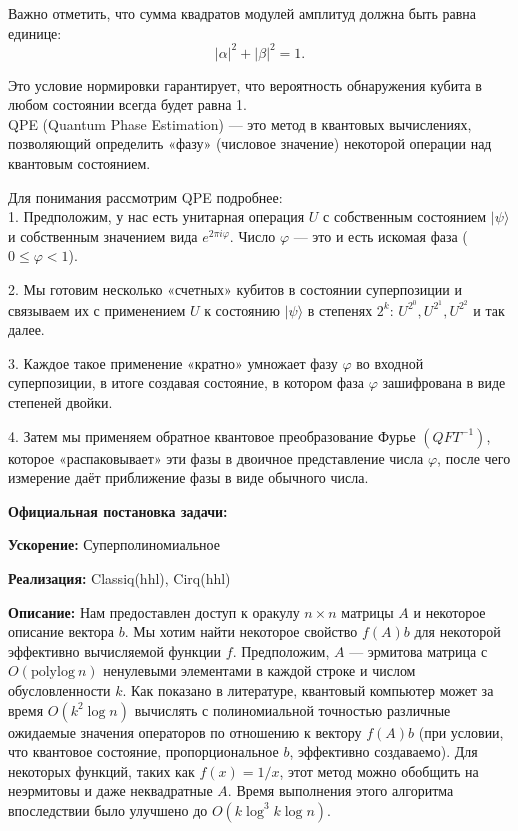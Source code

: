 Важно отметить, что сумма квадратов модулей амплитуд должна быть равна единице:
\[
|\alpha|^2 + |\beta|^2 = 1.
\]

Это условие нормировки гарантирует, что вероятность обнаружения кубита в любом состоянии всегда будет равна 1.\\

QPE (Quantum Phase Estimation) — это метод в квантовых вычислениях, позволяющий определить «фазу» (числовое значение) некоторой операции над квантовым состоянием.

Для понимания рассмотрим QPE подробнее: \\

1. Предположим, у нас есть унитарная операция \(U\) с собственным состоянием \(|\psi\rangle\) и собственным значением вида \(e^{2\pi i \varphi}\). Число \(\varphi\) — это и есть искомая фаза (\(0 \leq \varphi < 1\)).

2. Мы готовим несколько «счетных» кубитов в состоянии суперпозиции и связываем их с применением \(U\) к состоянию \(|\psi\rangle\) в степенях \(2^k\): \(U^{2^0}, U^{2^1}, U^{2^2}\) и так далее.

3. Каждое такое применение «кратно» умножает фазу \(\varphi\) во входной суперпозиции, в итоге создавая состояние, в котором фаза \(\varphi\) зашифрована в виде степеней двойки.

4. Затем мы применяем обратное квантовое преобразование Фурье \((QFT^{-1})\), которое «распаковывает» эти фазы в двоичное представление числа \(\varphi\), после чего измерение даёт приближение фазы в виде обычного числа.\\

\textbf{}

\textbf{Официальная постановка задачи:} 

\textbf{Ускорение:} Суперполиномиальное

\textbf{Реализация:} Classiq(hhl), Cirq(hhl)

\textbf{Описание:} Нам предоставлен доступ к оракулу $n \times n$ матрицы $A$ и некоторое описание вектора $b$. 
Мы хотим найти некоторое свойство $f(A)b$ для некоторой эффективно вычисляемой функции $f$. 
Предположим, $A$ — эрмитова матрица с $O(\text{polylog}~n)$ ненулевыми элементами в каждой строке и числом обусловленности $k$. 
Как показано в литературе, квантовый компьютер может за время $O(k^2 \log n)$ вычислять с полиномиальной точностью различные ожидаемые значения операторов по отношению к вектору $f(A)b$ (при условии, что квантовое состояние, пропорциональное $b$, эффективно создаваемо). Для некоторых функций, таких как $f(x)=1/x$, этот метод можно обобщить на неэрмитовы и даже неквадратные $A$. Время выполнения этого алгоритма впоследствии было улучшено до $O(k \log^3 k \log n)$. 

